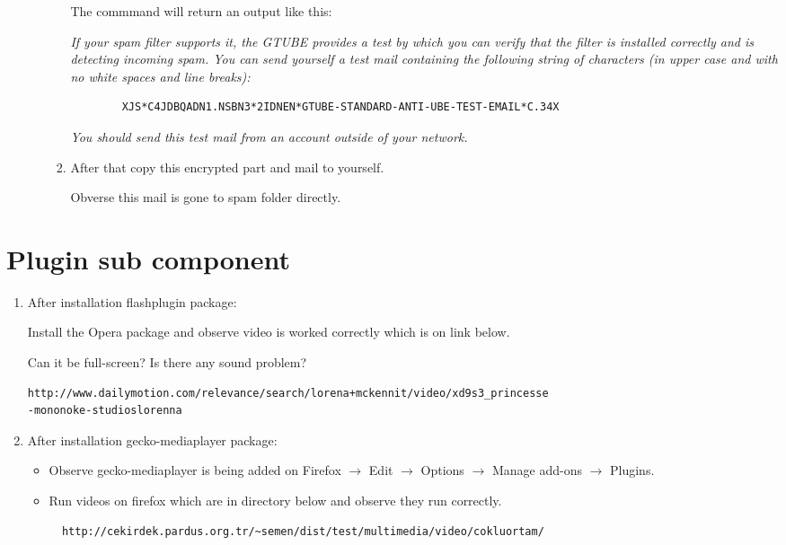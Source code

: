 \documentclass[a4paper,10pt]{article}
\begin{document}
\begin{enumerate}
\begin{enumerate}
\begin{enumerate}
		The commmand will return an output like this:
		
		\emph{If your spam filter supports it, the GTUBE provides a test by which you
	    	can verify that the filter is installed correctly and is detecting incoming
    		spam. You can send yourself a test mail containing the following string of
    		characters (in upper case and with no white spaces and line breaks):}
		\begin{verbatim}
 		XJS*C4JDBQADN1.NSBN3*2IDNEN*GTUBE-STANDARD-ANTI-UBE-TEST-EMAIL*C.34X
		\end{verbatim}
    		\emph{You should send this test mail from an account outside of your network.}

		\item After that copy this encrypted part and mail to yourself.
		
		Obverse this mail is gone to spam folder directly.
	\end{enumerate} 
\end{enumerate} 
\end{enumerate}
\section{Plugin sub component}
\begin{enumerate}
\item After installation flashplugin package:

Install the Opera package and observe video is worked correctly which is on link below.

Can it be full-screen? Is there any sound problem?
\begin{verbatim}
http://www.dailymotion.com/relevance/search/lorena+mckennit/video/xd9s3_princesse
-mononoke-studioslorenna 
\end{verbatim}
\item After installation gecko-mediaplayer package:
\begin{itemize}
  \item Observe gecko-mediaplayer is being added on Firefox $\rightarrow$ Edit $\rightarrow$ Options $\rightarrow$ Manage add-ons $\rightarrow$ Plugins.
  \item Run videos on firefox which are in directory below and observe they run correctly.
  \begin{verbatim}
  http://cekirdek.pardus.org.tr/~semen/dist/test/multimedia/video/cokluortam/  
  \end{verbatim}
\end{itemize}
\end{enumerate}
\end{document}
